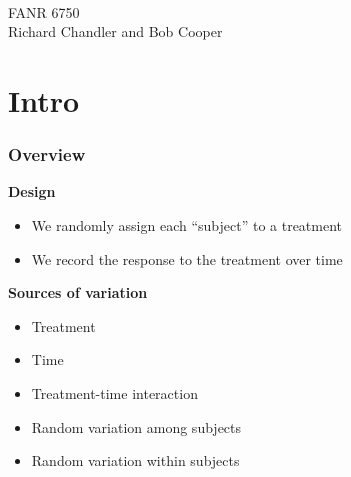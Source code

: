 \documentclass[color=usenames,dvipsnames]{beamer}\usepackage[]{graphicx}\usepackage[]{color}
\begin{document}



\begin{frame}[plain]
  \huge %
  \centering \par
  {\color{RoyalBlue}{Lab 10 -- Repeated Measures}} \\
  \vspace{1cm}
  \Large
  FANR 6750 \\
  \vfill
  \large
  Richard Chandler and Bob Cooper
\end{frame}


\section{Intro}


\begin{frame}%
  \frametitle{Overview}
  \large
  {\bf Design}
  \begin{itemize}
    \item We randomly assign each ``subject'' to a treatment
    \item We record the response to the treatment over time
  \end{itemize}
  \pause
  \vspace{0.5cm}
  {\bf Sources of variation}
  \begin{itemize}
    \item Treatment
    \item Time
    \item Treatment-time interaction
    \item Random variation among subjects
    \item Random variation within subjects
  \end{itemize}
\end{frame}
\end{document}
